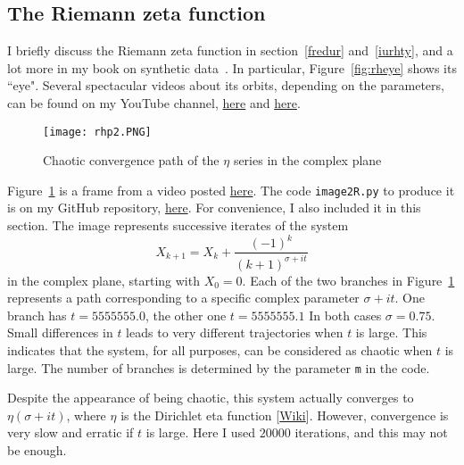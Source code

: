 \documentclass[oneside,10pt]{book}
\begin{document}

\subsection{The Riemann zeta function}

I briefly discuss the Riemann zeta function in section~\ref{fredur}
 and~\ref{iurhty}, and a lot more in my book on synthetic data~\cite{vgsynthetic}. In particular, Figure~\ref{fig:rheye} shows its ``eye". 
 Several spectacular videos about its orbits, depending on the parameters, can be
 found on my YouTube channel, \href{https://www.youtube.com/watch?v=MDBaJ8RsLA8}{here}
 and \href{https://www.youtube.com/watch?v=9IdkvifRFgU}{here}. 

\begin{figure}[H]
\centering
\texttt{[image: rhp2.PNG]} %
\caption{Chaotic convergence path of the $\eta$ series in the complex plane}
\label{gholgurew}
\end{figure}

Figure~\ref{gholgurew}  is a frame from a 
  video  posted \href{https://www.youtube.com/watch?v=XI5MhyNc7us}{here}. The code 
 \texttt{image2R.py}
 to produce it is on my GitHub repository, \href{https://github.com/VincentGranville/Visualizations/blob/main/Source-Code/image2R.py}{here}. For convenience, I also included it in this section. The image represents successive iterates of the system 
$$X_{k+1} = X_{k} + \frac{(-1)^{k}} {(k+1)^{\sigma+ it}}$$
in the complex plane, starting with $X_0 = 0$. Each of the two branches in Figure~\ref{gholgurew} represents a path corresponding to a specific
 complex parameter $\sigma + it$. One branch has $t=5555555.0$, the other one $t=5555555.1$ In both cases
 $\sigma=0.75$. Small differences in $t$ leads to very different trajectories when $t$ is large. This indicates that
 the system, for all purposes, can be considered as chaotic when $t$ is large. The number of branches is determined by the parameter \texttt{m} in the code.

Despite the appearance of being chaotic, this system actually converges to $\eta(\sigma+it)$, where
 $\eta$ is the \textcolor{index}{Dirichlet eta function} [\href{https://en.wikipedia.org/wiki/Dirichlet_eta_function}{Wiki}]. However, convergence is very slow and erratic if $t$ is large. Here I used $\num{20000}$ iterations, and this may not be enough. \vspace{1ex}
\end{document}
